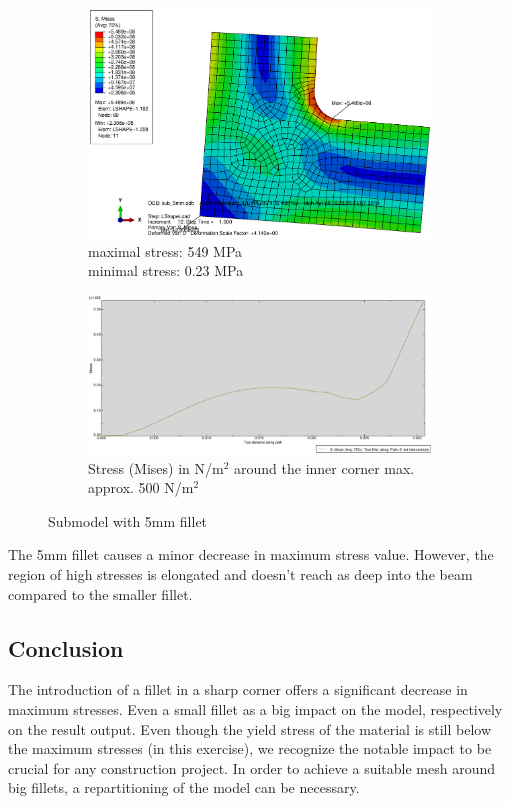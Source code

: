 \documentclass[12pt]{article}
\begin{document}
\begin{figure}[!htb]
  \centering
  \begin{subfigure}{.5\textwidth}
    \centering
    \includegraphics[width=0.95\linewidth]{pics/CPS8R_Fillet_Plot_Circle_Plot_5mm}
    \caption{maximal stress: 549 MPa \\\hspace{\textwidth}minimal stress: 0.23 MPa}
  \end{subfigure}%
  \begin{subfigure}{.5\textwidth}
    \centering
    \includegraphics[width=0.95\linewidth]{pics/CPS8R_Fillet_Plot_Circle_Plot_5mm_plot}
    \caption{Stress (Mises) in N/m$^{2}$ around the inner corner max. approx. 500 N/m$^{2}$}
   \end{subfigure}
  \caption{Submodel with 5mm fillet}
\end{figure}

The 5mm fillet causes a minor decrease in maximum stress value. However, the region 
of high stresses is elongated and doesn't reach as deep into the beam compared to the smaller fillet.
\subsection{Conclusion}
The introduction of a fillet in a sharp corner offers a significant decrease in maximum stresses. Even a 
small fillet as a big impact on the model, respectively on the result output. Even though the yield stress 
of the material is still below the maximum stresses (in this exercise), we recognize the notable impact to 
be crucial for any construction project. In order to achieve a suitable mesh around big fillets, a 
repartitioning of the model can be necessary. 
\cite{latexcompanion}
\end{document}
